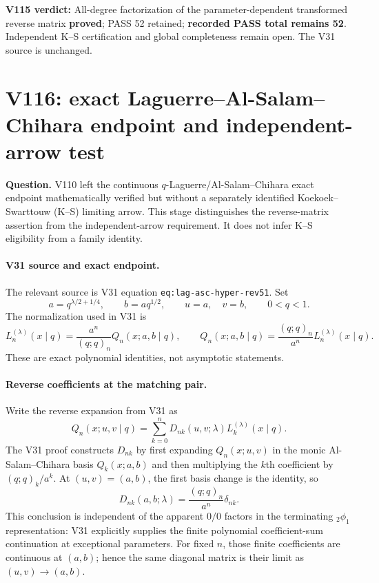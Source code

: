 \documentclass[11pt]{article}
\begin{document}
\noindent\textbf{V115 verdict:} All-degree factorization of the parameter-dependent transformed reverse matrix \textbf{proved}; PASS 52 retained; \textbf{recorded PASS total remains 52}. Independent K--S certification and global completeness remain open. The V31 source is unchanged.


\clearpage
\section{V116: exact Laguerre--Al-Salam--Chihara endpoint and independent-arrow test}
\noindent\textbf{Question.} V110 left the continuous $q$-Laguerre/Al-Salam--Chihara exact endpoint mathematically verified but without a separately identified Koekoek--Swarttouw (K--S) limiting arrow. This stage distinguishes the reverse-matrix assertion from the independent-arrow requirement. It does not infer K--S eligibility from a family identity.

\paragraph{V31 source and exact endpoint.}
The relevant source is V31 equation \texttt{eq:lag-asc-hyper-rev51}. Set
\[
 a=q^{\lambda/2+1/4},\qquad b=aq^{1/2},\qquad
 u=a,\quad v=b,\qquad 0<q<1.
\]
The normalization used in V31 is
\begin{equation}\label{eq:v116-asc-lag}
 L_n^{(\lambda)}(x\mid q)=\frac{a^n}{(q;q)_n}Q_n(x;a,b\mid q),
 \qquad Q_n(x;a,b\mid q)=\frac{(q;q)_n}{a^n}L_n^{(\lambda)}(x\mid q).
\end{equation}
These are exact polynomial identities, not asymptotic statements.

\paragraph{Reverse coefficients at the matching pair.}
Write the reverse expansion from V31 as
\[
 Q_n(x;u,v\mid q)=\sum_{k=0}^n D_{nk}(u,v;\lambda)L_k^{(\lambda)}(x\mid q).
\]
The V31 proof constructs $D_{nk}$ by first expanding $Q_n(x;u,v)$ in the monic Al-Salam--Chihara basis $Q_k(x;a,b)$ and then multiplying the $k$th coefficient by $(q;q)_k/a^k$. At $(u,v)=(a,b)$, the first basis change is the identity, so
\begin{equation}\label{eq:v116-diag}
 \boxed{D_{nk}(a,b;\lambda)=\frac{(q;q)_n}{a^n}\delta_{nk}.}
\end{equation}
This conclusion is independent of the apparent $0/0$ factors in the terminating ${}_2\phi_1$ representation: V31 explicitly supplies the finite polynomial coefficient-sum continuation at exceptional parameters. For fixed $n$, those finite coefficients are continuous at $(a,b)$; hence the same diagonal matrix is their limit as $(u,v)\to(a,b)$.
\end{document}
